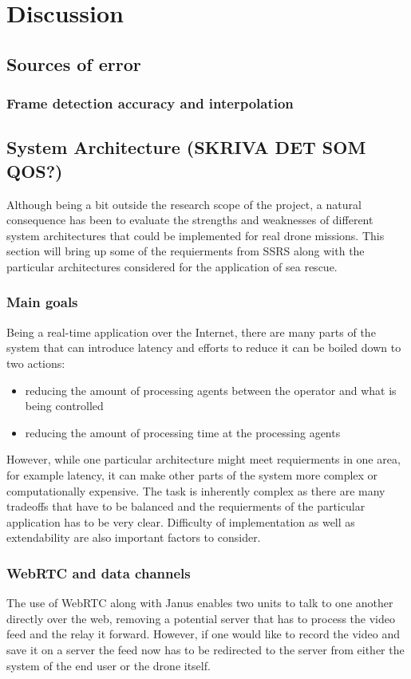 \documentclass[nofilelist]{cslthse-msc}
\begin{document}
\chapter{Discussion}
\section{Sources of error}
\subsection{Frame detection accuracy and interpolation} 


\section{System Architecture (SKRIVA DET SOM QOS?)}
Although being a bit outside the research scope of the project, a natural consequence has been to evaluate the strengths and weaknesses of different system architectures that could be implemented for real drone missions. This section will bring up some of the requierments from SSRS along with the particular architectures considered for the application of sea rescue.

\subsection{Main goals}
Being a real-time application over the Internet, there are many parts of the system that can introduce latency and efforts to reduce it can be boiled down to two actions: 
\begin{itemize}
   \item reducing the amount of processing agents between the operator and what is being controlled
   \item reducing the amount of processing time at the processing agents
\end{itemize} 
However, while one particular architecture might meet requierments in one area, for example latency, it can make other parts of the system more complex or computationally expensive. The task is inherently complex as there are many tradeoffs that have to be balanced and the requierments of the particular application has to be very clear. Difficulty of implementation as well as extendability are also important factors to consider. 

\subsection{WebRTC and data channels}
The use of WebRTC along with Janus enables two units to talk to one another directly over the web, removing a potential server that has to process the video feed and the relay it forward. However, if one would like to record the video and save it on a server the feed now has to be redirected to the server from either the system of the end user or the drone itself. 
\end{document}
